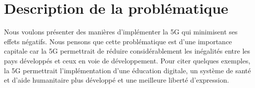 \documentclass[11pt]{article}
\date{\today}
\title{}
\begin{document}
\tableofcontents

\section{Description de la problématique}
\label{sec:orgbdc7b1c}
Nous voulons présenter des manières d'implémenter la 5G qui minimisent ses effets négatifs.
Nous pensons que cette problématique est d'une importance capitale car la 5G permettrait de réduire considérablement les inégalités entre les pays développés et ceux en voie de développement.
Pour citer quelques exemples, la 5G permettrait l'implémentation d'une éducation digitale, un système de santé et d'aide humanitaire plus développé et une meilleure liberté d'expression.
\end{document}

